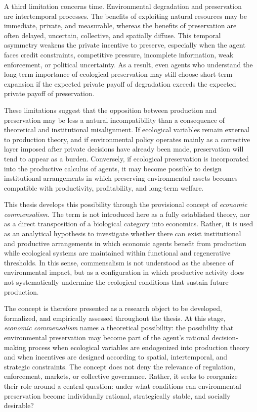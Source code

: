 A third limitation concerns time. Environmental degradation and preservation are intertemporal processes. The benefits of exploiting natural resources may be immediate, private, and measurable, whereas the benefits of preservation are often delayed, uncertain, collective, and spatially diffuse. This temporal asymmetry weakens the private incentive to preserve, especially when the agent faces credit constraints, competitive pressure, incomplete information, weak enforcement, or political uncertainty. As a result, even agents who understand the long-term importance of ecological preservation may still choose short-term expansion if the expected private payoff of degradation exceeds the expected private payoff of preservation.

These limitations suggest that the opposition between production and preservation may be less a natural incompatibility than a consequence of theoretical and institutional misalignment. If ecological variables remain external to production theory, and if environmental policy operates mainly as a corrective layer imposed after private decisions have already been made, preservation will tend to appear as a burden. Conversely, if ecological preservation is incorporated into the productive calculus of agents, it may become possible to design institutional arrangements in which preserving environmental assets becomes compatible with productivity, profitability, and long-term welfare.

This thesis develops this possibility through the provisional concept of \emph{economic commensalism}. The term is not introduced here as a fully established theory, nor as a direct transposition of a biological category into economics. Rather, it is used as an analytical hypothesis to investigate whether there can exist institutional and productive arrangements in which economic agents benefit from production while ecological systems are maintained within functional and regenerative thresholds. In this sense, commensalism is not understood as the absence of environmental impact, but as a configuration in which productive activity does not systematically undermine the ecological conditions that sustain future production.

The concept is therefore presented as a research object to be developed, formalized, and empirically assessed throughout the thesis. At this stage, \emph{economic commensalism} names a theoretical possibility: the possibility that environmental preservation may become part of the agent's rational decision-making process when ecological variables are endogenized into production theory and when incentives are designed according to spatial, intertemporal, and strategic constraints. The concept does not deny the relevance of regulation, enforcement, markets, or collective governance. Rather, it seeks to reorganize their role around a central question: under what conditions can environmental preservation become individually rational, strategically stable, and socially desirable?

